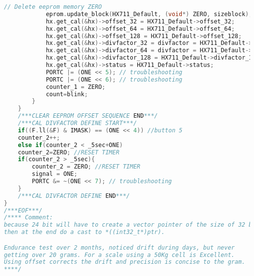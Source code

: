 \begin{lstlisting}[language=C, caption={main.c}, label=main-c, captionpos=b]
			// Delete eeprom memory ZERO
			eprom.update_block(HX711_Default, (void*) ZERO, sizeblock);
			hx.get_cal(&hx)->offset_32 = HX711_Default->offset_32;
			hx.get_cal(&hx)->offset_64 = HX711_Default->offset_64;
			hx.get_cal(&hx)->offset_128 = HX711_Default->offset_128;
			hx.get_cal(&hx)->divfactor_32 = divfactor = HX711_Default->divfactor_32;
			hx.get_cal(&hx)->divfactor_64 = divfactor = HX711_Default->divfactor_64;
			hx.get_cal(&hx)->divfactor_128 = HX711_Default->divfactor_128;
			hx.get_cal(&hx)->status = HX711_Default->status;
			PORTC |= (ONE << 5); // troubleshooting
			PORTC |= (ONE << 6); // troubleshooting
			counter_1 = ZERO;
			count=blink;
		}
	}
	/***CLEAR EEPROM OFFSET SEQUENCE END***/
	/***CAL DIVFACTOR DEFINE START***/
	if((F.ll(&F) & IMASK) == (ONE << 4)) //button 5
	counter_2++;
	else if(counter_2 < _5sec+ONE)
	counter_2=ZERO; //RESET TIMER
	if(counter_2 > _5sec){
		counter_2 = ZERO; //RESET TIMER
		signal = ONE;
		PORTC &= ~(ONE << 7); // troubleshooting
	}
	/***CAL DIVFACTOR DEFINE END***/
}
/***EOF***/
/**** Comment:
because 24 bit will have to create a vector pointer of the size of 32 bit,
then at the end do a cast to *((int32_t*)ptr).

Endurance test over 2 months, noticed drift during days, but never
getting over 20 grams. For a scale using a 50Kg cell is Excellent.
Using offset corrects the drift and precision is concise to the gram.
****/
\end{lstlisting}

